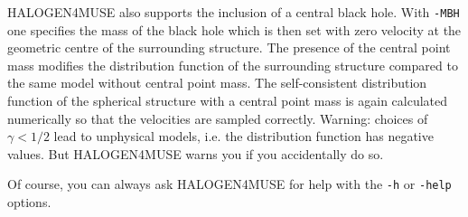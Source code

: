 \documentclass[a4paper,10pt]{article}
\begin{document}
HALOGEN4MUSE also supports the inclusion of a central black hole. With \texttt{-MBH} one specifies the mass of the black hole which is then set with zero velocity at the geometric centre of the surrounding structure. The presence of the central point mass modifies the distribution function of the surrounding structure compared to the same model without central point mass. The self-consistent distribution function of the spherical structure with a central point mass is again calculated numerically so that the velocities are sampled correctly. Warning: choices of $\gamma < 1/2$ lead to unphysical models, i.e. the distribution function has negative values. But HALOGEN4MUSE warns you if you accidentally do so.

Of course, you can always ask HALOGEN4MUSE for help with the \texttt{-h} or \texttt{-help} options.
\end{document}
